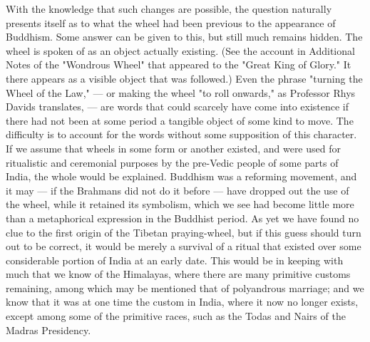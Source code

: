 \documentclass[a4paper, 11pt, oneside, polutonikogreek, english]{article}
\begin{document}
With the knowledge that such changes are possible, the question naturally presents itself as to what the wheel had been previous to the appearance of Buddhism. Some answer can be given to this, but still much remains hidden. The wheel is spoken of as an object actually existing. (See the account in Additional Notes of the "Wondrous Wheel" that appeared to the "Great King of Glory." It there appears as a visible object that was followed.) Even the phrase "turning the Wheel of the Law," --- or making the wheel "to roll onwards," as Professor Rhys Davids translates, --- are words that could scarcely have come into existence if there had not been at some period a tangible object of some kind to move. The difficulty is to account for the words without some supposition of this character. If we assume that wheels in some form or another existed, and were used for ritualistic and ceremonial purposes by the pre-Vedic people of some parts of India, the whole would be explained. Buddhism was a reforming movement, and it may --- if the Brahmans did not do it before --- have dropped out the use of the wheel, while it retained its symbolism, which we see had become little more than a metaphorical expression in the Buddhist period. As yet we have found no clue to the first origin of the Tibetan praying-wheel, but if this guess should turn out to be correct, it would be merely a survival of a ritual that existed over some considerable portion of India at an early date. This would be in keeping with much that we know of the Himalayas, where there are many primitive customs remaining, among which may be mentioned that of polyandrous marriage; and we know that it was at one time the custom in India, where it now no longer exists, except among some of the primitive races, such as the Todas and Nairs of the Madras Presidency.
\end{document}

